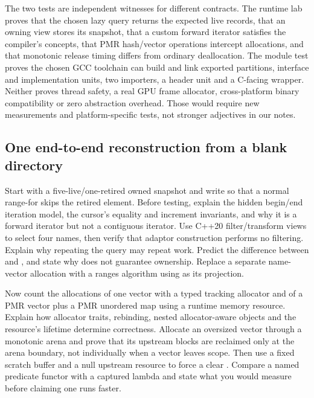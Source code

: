 The two tests are independent witnesses for different contracts. The runtime lab proves that the chosen lazy query returns the expected live records, that an owning view stores its snapshot, that a custom forward iterator satisfies the compiler's concepts, that PMR hash/vector operations intercept allocations, and that monotonic release timing differs from ordinary deallocation. The module test proves the chosen GCC toolchain can build and link exported partitions, interface and implementation units, two importers, a header unit and a C-facing wrapper. Neither proves thread safety, a real GPU frame allocator, cross-platform binary compatibility or zero abstraction overhead. Those would require new measurements and platform-specific tests, not stronger adjectives in our notes.

\subsection{One end-to-end reconstruction from a blank directory}\label{05-engine-i-ch006-one-end-to-end-reconstruction-from-a-blank-directory}

\hypertarget{05-engine-i-ch006-one-end-to-end-reconstruction-from-a-blank-directory}{}

Start with a five-live/one-retired owned snapshot and write  so that a normal range-for skips the retired element. Before testing, explain the hidden begin/end iteration model, the cursor's equality and increment invariants, and why it is a forward iterator but not a contiguous iterator. Use C++20 filter/transform views to select four names, then verify that adaptor construction performs no filtering. Explain why repeating the query may repeat work. Predict the difference between  and , and state why  does not guarantee ownership. Replace a separate name-vector allocation with a ranges algorithm using  as its projection.

Now count the allocations of one vector with a typed tracking allocator and of a PMR vector plus a PMR unordered map using a runtime memory resource. Explain how allocator traits, rebinding, nested allocator-aware objects and the resource's lifetime determine correctness. Allocate an oversized vector through a monotonic arena and prove that its upstream blocks are reclaimed only at the arena boundary, not individually when a vector leaves scope. Then use a fixed scratch buffer and a null upstream resource to force a clear . Compare a named predicate functor with a captured lambda and state what you would measure before claiming one runs faster.

